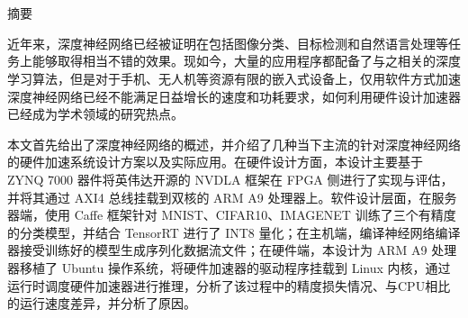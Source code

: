 \maketitle%
\chapter[摘要]{\MyTitleCh}
\setcounter{page}{1}%

\begin{center}
\vspace{-0.3cm}
 \songti 摘要
\vspace{0.3cm}
\end{center}

近年来，深度神经网络已经被证明在包括图像分类、目标检测和自然语言处理等任务上能够取得相当不错的效果。现如今，大量的应用程序都配备了与之相关的深度学习算法，但是对于手机、无人机等资源有限的嵌入式设备上，仅用软件方式加速深度神经网络已经不能满足日益增长的速度和功耗要求，如何利用硬件设计加速器已经成为学术领域的研究热点。

本文首先给出了深度神经网络的概述，并介绍了几种当下主流的针对深度神经网络的硬件加速系统设计方案以及实际应用。在硬件设计方面，本设计主要基于 ZYNQ 7000 器件将英伟达开源的 NVDLA 框架在 FPGA 侧进行了实现与评估，并将其通过 AXI4 总线挂载到双核的 ARM A9 处理器上。软件设计层面，在服务器端，使用 Caffe 框架针对 MNIST、CIFAR10、IMAGENET 训练了三个有精度的分类模型，并结合 TensorRT 进行了 INT8 量化；在主机端，编译神经网络编译器接受训练好的模型生成序列化数据流文件；在硬件端，本设计为 ARM A9 处理器移植了 Ubuntu 操作系统，将硬件加速器的驱动程序挂载到 Linux 内核，通过运行时调度硬件加速器进行推理，分析了该过程中的精度损失情况、与CPU相比的运行速度差异，并分析了原因。

{
}

